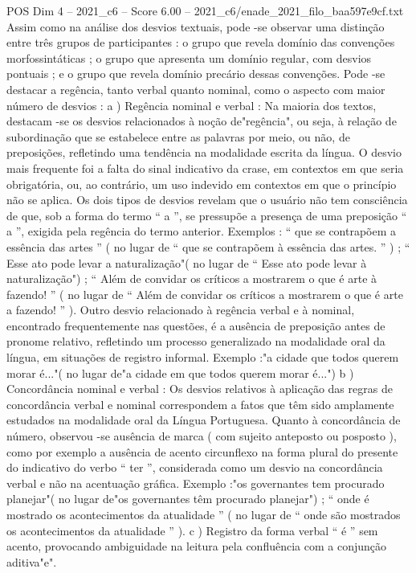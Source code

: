 \begin{textsample}{POS Dim 4 – 2021\_c6 – Score 6.00 – 2021\_c6/enade\_2021\_filo\_baa597e9cf.txt}
Assim como na análise dos desvios textuais, pode -se observar uma distinção entre três grupos de participantes : o grupo que revela domínio das convenções morfossintáticas ; o grupo que apresenta um domínio regular, com desvios pontuais ; e o grupo que revela domínio precário dessas convenções.
Pode -se destacar a regência, tanto verbal quanto nominal, como o aspecto com maior número de desvios : a ) Regência nominal e verbal : Na maioria dos textos, destacam -se os desvios relacionados à noção de"regência", ou seja, à relação de subordinação que se estabelece entre as palavras por meio, ou não, de preposições, refletindo uma tendência na modalidade escrita da língua.
O desvio mais frequente foi a falta do sinal indicativo da crase, em contextos em que seria obrigatória, ou, ao contrário, um uso indevido em contextos em que o princípio não se aplica.
Os dois tipos de desvios revelam que o usuário não tem consciência de que, sob a forma do termo “ a ”, se pressupõe a presença de uma preposição “ a ”, exigida pela regência do termo anterior.
Exemplos : “ que se contrapõem a essência das artes ” ( no lugar de “ que se contrapõem à essência das artes. ” ) ; “ Esse ato pode levar a naturalização"( no lugar de “ Esse ato pode levar à naturalização") ; “ Além de convidar os críticos a mostrarem o que é arte à fazendo! ” ( no lugar de “ Além de convidar os críticos a mostrarem o que é arte a fazendo! ” ).
Outro desvio relacionado à regência verbal e à nominal, encontrado frequentemente nas questões, é a ausência de preposição antes de pronome relativo, refletindo um processo generalizado na modalidade oral da língua, em situações de registro informal.
Exemplo :"a cidade que todos querem morar é..."( no lugar de"a cidade em que todos querem morar é...") b ) Concordância nominal e verbal : Os desvios relativos à aplicação das regras de concordância verbal e nominal correspondem a fatos que têm sido amplamente estudados na modalidade oral da Língua Portuguesa.
Quanto à concordância de número, observou -se ausência de marca ( com sujeito anteposto ou posposto ), como por exemplo a ausência de acento circunflexo na forma plural do presente do indicativo do verbo “ ter ”, considerada como um desvio na concordância verbal e não na acentuação gráfica.
Exemplo :"os governantes tem procurado planejar"( no lugar de"os governantes têm procurado planejar") ; “ onde é mostrado os acontecimentos da atualidade ” ( no lugar de “ onde são mostrados os acontecimentos da atualidade ” ). c ) Registro da forma verbal “ é ” sem acento, provocando ambiguidade na leitura pela confluência com a conjunção aditiva"e".

\end{textsample}
